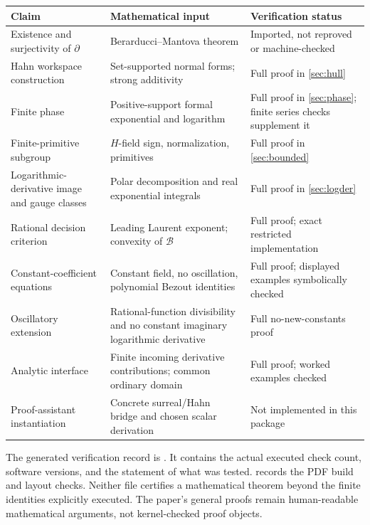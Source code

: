 \documentclass[11pt,a4paper]{article}
\theoremstyle{definition}
\newcommand{\D}{\partial}
\newcommand{\BB}{\mathcal B}
\numberwithin{equation}{section}
\begin{document}
\begin{longtable}{L{0.30\textwidth}L{0.33\textwidth}L{0.28\textwidth}}
\toprule
Claim & Mathematical input & Verification status\\
\midrule
\endhead
Existence and surjectivity of $\D$ & Berarducci--Mantova theorem & Imported,
not reproved or machine-checked\\
Hahn workspace construction & Set-supported normal forms; strong additivity &
Full proof in \cref{sec:hull}\\
Finite phase & Positive-support formal exponential and logarithm & Full
proof in \cref{sec:phase}; finite series checks supplement it\\
Finite-primitive subgroup & $H$-field sign, normalization, primitives & Full
proof in \cref{sec:bounded}\\
Logarithmic-derivative image and gauge classes & Polar decomposition and
real exponential integrals & Full proof in \cref{sec:logder}\\
Rational decision criterion & Leading Laurent exponent; convexity of $\BB$ &
Full proof; exact restricted implementation\\
Constant-coefficient equations & Constant field, no oscillation, polynomial
Bezout identities & Full proof; displayed examples symbolically checked\\
Oscillatory extension & Rational-function divisibility and no constant
imaginary logarithmic derivative & Full no-new-constants proof\\
Analytic interface & Finite incoming derivative contributions; common
ordinary domain & Full proof; worked examples checked\\
Proof-assistant instantiation & Concrete surreal/Hahn bridge and chosen
scalar derivation & Not implemented in this package\\
\bottomrule
\end{longtable}

The generated verification record is .
It contains the actual executed check count, software versions, and the
statement of what was tested.  records the
PDF build and layout checks. Neither file certifies a mathematical theorem
beyond the finite identities explicitly executed. The paper's general
proofs remain human-readable mathematical arguments, not kernel-checked
proof objects.
\end{document}
